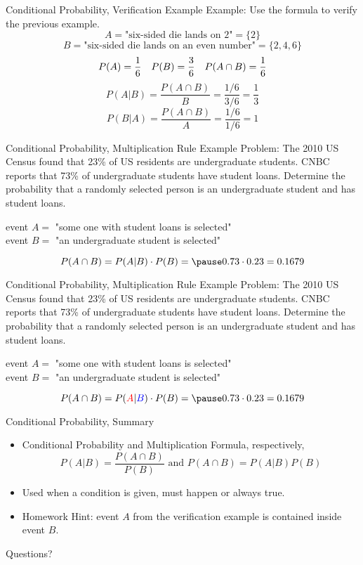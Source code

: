 \documentclass[handout]{beamer}
\newcommand{\blue}[1]{{\color{blue} #1}}
\newcommand{\red}[1]{{\color{red} #1}}
\newcommand{\qtns}[0]{\begin{center} Questions? \end{center}}
\newcommand{\nl}[1]{\vspace{#1 em}}
\begin{document}
\begin{frame}{Conditional Probability, Verification Example}
Example: Use the formula to verify the previous example.
    \[A = \text{"six-sided die lands on 2"} = \{2\}\] 
    \[B = \text{"six-sided die lands on an even number"} = \{2,4,6\}\]
    \[P(A) = \frac{1}{6} \hskip 1em P(B) = \frac{3}{6} \hskip 1em P(A \cap B) = \frac{1}{6}\]
    \pause \[P(A|B) = \frac{P(A\cap B)}{B} = \frac{1/6}{3/6} = \frac{1}{3}\]
    \[P(B|A) = \frac{P(A\cap B)}{A} = \frac{1/6}{1/6} = 1\]
\end{frame}

\begin{frame}{Conditional Probability, Multiplication Rule Example}
    Problem: The 2010 US Census found that 23\% of US residents are undergraduate students. CNBC reports that 73\% of undergraduate students have student loans. Determine the probability that a randomly selected person is an undergraduate student and has student loans. \\
    \nl{0.5}
    \begin{center}
        event $A =$ "some one with student loans is selected"\\ \nl{0.5}
        event $B =$ "an undergraduate student is selected"
    \end{center}
    \[P(A \cap B) = P(A|B) \cdot P(B) = \pause 0.73 \cdot 0.23 = 0.1679\]
    \end{frame}

    \begin{frame}{Conditional Probability, Multiplication Rule Example}
        Problem: The 2010 US Census found that 23\% of US residents are undergraduate students. CNBC reports that 73\% \blue{of undergraduate students} \red{have student loans}. Determine the probability that a randomly selected person is an undergraduate student and has student loans. \\
        \nl{0.5}
        \begin{center}
            event $A =$ "some one with student loans is selected"\\ \nl{0.5}
            event $B =$ "an undergraduate student is selected"
        \end{center}
        \[P(A \cap B) = P(\red{A}|\blue{B}) \cdot P(B) = \pause 0.73 \cdot 0.23 = 0.1679\]
    \end{frame}

    \begin{frame}{Conditional Probability, Summary}
        \begin{itemize} 
            \item Conditional Probability and Multiplication Formula, respectively,
            \[P(A|B) = \frac{P(A\cap B)}{P(B)} \text{ and } P(A \cap B) = P(A|B) P(B)\]
            \item Used when a condition is given, must happen or always true.
            \item Homework Hint: event $A$ from the verification example is contained inside event $B$.
        \end{itemize}
        \qtns
    \end{frame}
\end{document}
